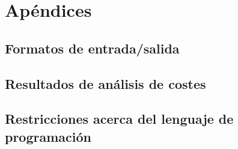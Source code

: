 \chapter{Apéndices}

\section{Formatos de entrada/salida}

\section{Resultados de análisis de costes}

\section{Restricciones acerca del lenguaje de programación}